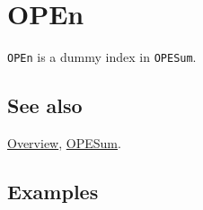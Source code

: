 \documentclass[../FeynCalcManual.tex]{subfiles}
\begin{document}
\hypertarget{open}{%
\section{OPEn}\label{open}}

\texttt{OPEn} is a dummy index in \texttt{OPESum}.

\subsection{See also}

\hyperlink{toc}{Overview}, \hyperlink{opesum}{OPESum}.

\subsection{Examples}
\end{document}
